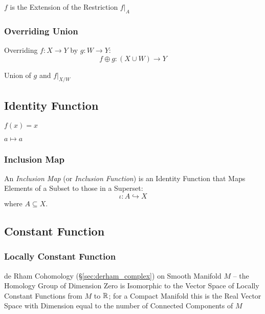 $f$ is the Extension of the Restriction $f|_A$



\subsubsection{Overriding Union}\label{sec:overriding_union}

Overriding $f : X \rightarrow Y$ by $g : W \rightarrow Y$:
\[
  f \oplus g : (X \cup W) \rightarrow Y
\]

Union of $g$ and $f|_{X/W}$



\subsection{Identity Function}\label{sec:identity_function}

$f(x) = x$

$a \mapsto a$



\subsubsection{Inclusion Map}\label{sec:inclusion_map}

An \emph{Inclusion Map} (or \emph{Inclusion Function}) is an Identity
Function that Maps Elements of a Subset to those in a Superset:
\[
  \iota : A \hookrightarrow X
\]
where $A \subseteq X$.



\subsection{Constant Function}\label{sec:constant_function}

\subsubsection{Locally Constant Function}\label{sec:locally_constant}

\fist de Rham Cohomology (\S\ref{sec:derham_complex}) on Smooth Manifold $M$ --
the Homology Group of Dimension Zero is Isomorphic to the Vector Space of
Locally Constant Functions from $M$ to $\mathbb{R}$; for a Compact Manifold this is
the Real Vector Space with Dimension equal to the number of Connected Components
of $M$




